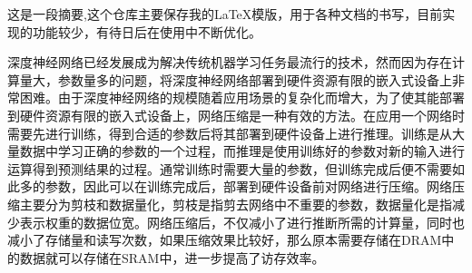 这是一段摘要,这个仓库主要保存我的\LaTeX 模版，用于各种文档的书写，目前实现的功能较少，有待日后在使用中不断优化。

深度神经网络已经发展成为解决传统机器学习任务最流行的技术，然而因为存在计算量大，参数量多的问题，将深度神经网络部署到硬件资源有限的嵌入式设备上非常困难。由于深度神经网络的规模随着应用场景的复杂化而增大，为了使其能部署到硬件资源有限的嵌入式设备上，网络压缩是一种有效的方法。在应用一个网络时需要先进行训练，得到合适的参数后将其部署到硬件设备上进行推理。训练是从大量数据中学习正确的参数的一个过程，而推理是使用训练好的参数对新的输入进行运算得到预测结果的过程。通常训练时需要大量的参数，但训练完成后便不需要如此多的参数，因此可以在训练完成后，部署到硬件设备前对网络进行压缩。网络压缩主要分为剪枝和数据量化，剪枝是指剪去网络中不重要的参数，数据量化是指减少表示权重的数据位宽。网络压缩后，不仅减小了进行推断所需的计算量，同时也减小了存储量和读写次数，如果压缩效果比较好，那么原本需要存储在DRAM中的数据就可以存储在SRAM中，进一步提高了访存效率。